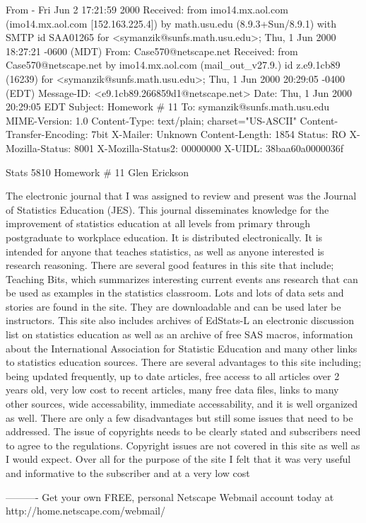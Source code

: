 From - Fri Jun  2 17:21:59 2000
Received: from imo14.mx.aol.com (imo14.mx.aol.com [152.163.225.4])
	by math.usu.edu (8.9.3+Sun/8.9.1) with SMTP id SAA01265
	for <symanzik@sunfs.math.usu.edu>; Thu, 1 Jun 2000 18:27:21 -0600 (MDT)
From: Case570@netscape.net
Received: from Case570@netscape.net
	by imo14.mx.aol.com (mail_out_v27.9.) id z.e9.1cb89 (16239)
	 for <symanzik@sunfs.math.usu.edu>; Thu, 1 Jun 2000 20:29:05 -0400 (EDT)
Message-ID: <e9.1cb89.266859d1@netscape.net>
Date: Thu, 1 Jun 2000 20:29:05 EDT
Subject:  Homework # 11
To: symanzik@sunfs.math.usu.edu
MIME-Version: 1.0
Content-Type: text/plain; charset="US-ASCII"
Content-Transfer-Encoding: 7bit
X-Mailer: Unknown
Content-Length: 1854
Status: RO
X-Mozilla-Status: 8001
X-Mozilla-Status2: 00000000
X-UIDL: 38baa60a0000036f

Stats 5810
Homework # 11
Glen Erickson

     The electronic journal that I was assigned to review and present was the Journal of Statistics Education (JES). This journal disseminates knowledge for the improvement of statistics education at all levels from primary through postgraduate to workplace education. It is distributed electronically. It is intended for anyone that teaches statistics, as well as anyone interested is research reasoning.
     There are several good features in this site that include; Teaching Bits, which summarizes interesting current events ans research that can be used as examples in the statistics classroom. Lots and lots of data sets and stories are found in the site. They are downloadable and can be used later be instructors. This site also includes archives of EdStats-L an electronic discussion list on statistics education as well as an archive of free SAS macros, information about the International Association for Statistic Education and many other links to statistics education sources.
     There are several advantages to this site including; being updated frequently, up to date articles, free access to all articles over 2 years old, very low cost to recent articles, many free data files, links to many other sources, wide accessability, immediate accessability, and it is well organized as well.
     There are only  a few disadvantages but still some issues that need to be addressed. The issue of copyrights needs to be clearly stated and subscribers need to agree to the regulations. Copyright issues are not covered in this site as well as I would expect.
     Over all for the purpose of the site I felt that it was very useful and informative to the subscriber and at a very low cost

     

----------
Get your own FREE, personal Netscape Webmail account today at http://home.netscape.com/webmail/
